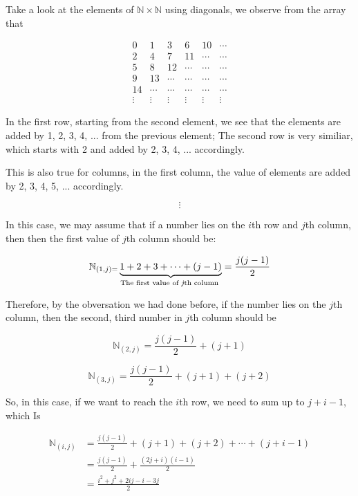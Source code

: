 \documentclass[12pt]{article}
\begin{document}
Take a look at the elements of $\mathbb{N} \times \mathbb{N}$
using diagonals, we observe from the array that

\[ \begin{matrix}
    0&1&3&6&10&\cdots \\
    2&4&7&11& \cdots &\cdots \\
    5&8&12&\cdots&\cdots&\cdots \\
    9&13&\cdots&\cdots&\cdots&\cdots\\
    14&\cdots&\cdots&\cdots&\cdots&\cdots \\
    \vdots&\vdots&\vdots&\vdots&\vdots&\vdots
    
\end{matrix}\]

\vspace*{0.3cm}
In the first row, starting from the second element, we see that the elements are added by
1, 2, 3, 4, ... from the previous element; The second row is very similiar, which starts with 2 and
added by 2, 3, 4, ... accordingly.

\vspace*{0.3cm}
This is also true for columns, in the first column, the value of elements are added by 2,
 3, 4, 5, ... accordingly.




\[ \vdots \]

In this case, we may assume that if a number lies on the $i$th row and $j$th column, then
then the first value of $j$th column should be:

\[ \mathbb{N}_{(1,j) = }\underbrace{1+2+3+ \cdots + (j-1)}_\text{The first value of \textit{j}th column } 
= \frac{j(j-1)}{2}\]

\vspace*{0.3cm}
Therefore, by the obversation we had done before, if the number lies
on the $j$th column, then the second, third number in $j$th column 
should be 

\[ \mathbb{N}_{(2,j)} = \frac{j(j-1)}{2} + (j+1)\]

\[ \mathbb{N}_{(3,j)} = \frac{j(j-1)}{2} + (j+1)+(j+2)\]


So, in this case, if we want to reach the $i$th row, we need to sum up to $j+i-1$, which Is

\begin{align*}
    \mathbb{N}_{(i,j)} &= \frac{j(j-1)}{2} + (j+1) + (j+2) + \cdots + (j+i-1) \\
     &= \frac{j(j-1)}{2} + \frac{(2j+i)(i-1)}{2} \\
     & = \frac{i^2+j^2+2ij-i-3j}{2}
\end{align*}
\end{document}
